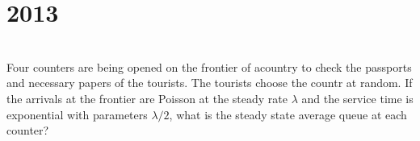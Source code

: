 \section*{2013}
\vspace{-.5cm}
\hrulefill \smallskip\\
 Four counters are being opened on the frontier of acountry to check the passports and necessary papers of the tourists. The tourists choose the countr at random. If the arrivals at the frontier are Poisson at the steady rate $\lambda$ and the service time is exponential with parameters $\lambda / 2$, what is the steady state average queue at each counter?